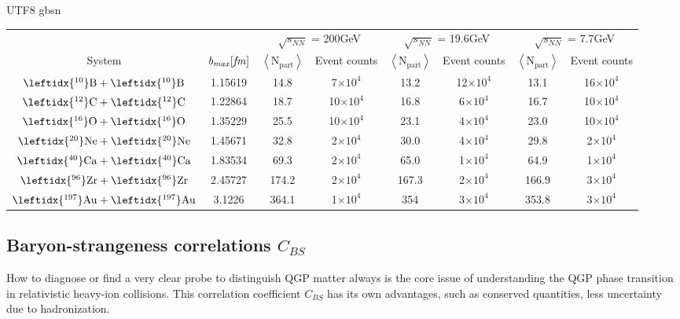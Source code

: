 \documentclass[twocolumn,showpacs,preprintnumbers,superscriptaddress,amsmath,amssymb]{revtex4}
\begin{document}
\begin{CJK*} {UTF8} {gbsn}
\begin{table*}[]
	\begin{tabular}{cc|cc|cc|cc}
\toprule
\multicolumn{2}{c}{} & \multicolumn{2}{c}{$\sqrt{s_{NN}}$ = 200GeV} & \multicolumn{2}{c}{$\sqrt{s_{NN}}$ = 19.6GeV} & \multicolumn{2}{c}{$\sqrt{s_{NN}}$ = 7.7GeV} \\
\cmidrule(r){3-4} \cmidrule(r){5-6} \cmidrule(r){7-8}
System & $\mathrm{\it{b_{max}}[\it{fm}]}$
&$\left\langle \mathrm{N_{part}}\right\rangle$ &Event counts
&$\left\langle \mathrm{N_{part}}\right\rangle$ &Event counts
&$\left\langle \mathrm{N_{part}}\right\rangle$ &Event counts      \\
\hline
$\mathrm{\leftidx{^{10}}B} + \mathrm{\leftidx{^{10}}B}$		&1.15619		&14.8  &7$\times 10^{4}$    	&13.2  &12$\times 10^{4}$  &13.1  &16$\times 10^{4}$\\
$\mathrm{\leftidx{^{12}}C} + \mathrm{\leftidx{^{12}}C}$		&1.22864		&18.7  &10$\times 10^{4}$    	&16.8  &6$\times 10^{4}$ 	&16.7  &10$\times 10^{4}$\\
$\mathrm{\leftidx{^{16}}O}+\mathrm{\leftidx{^{16}}O}$		&1.35229		&25.5   &10$\times 10^{4}$	&23.1  &4$\times 10^{4}$	&23.0  &10$\times 10^{4}$ \\
$\mathrm{\leftidx{^{20}}Ne}+\mathrm{\leftidx{^{20}}Ne}$		&1.45671		&32.8  &2$\times 10^{4}$	&30.0  &4$\times 10^{4}$	&29.8  &2$\times 10^{4}$\\
$\mathrm{\leftidx{^{40}}Ca}+\mathrm{\leftidx{^{40}}Ca}$		&1.83534		&69.3  &2$\times 10^{4}$	&65.0  &1$\times 10^{4}$	&64.9  &1$\times 10^{4}$ \\
$\mathrm{\leftidx{^{96}}Zr}+\mathrm{\leftidx{^{96}}Zr}$ 		&2.45727		&174.2 &2$\times 10^{4}$	&167.3  &2$\times 10^{4}$	&166.9 &3$\times 10^{4}$\\
$\mathrm{\leftidx{^{197}}Au}+\mathrm{\leftidx{^{197}}Au}$		&3.1226		&364.1 &1$\times 10^{4}$	&354  &3$\times 10^{4}$	&353.8  &3$\times 10^{4}$\\
\bottomrule
\end{tabular}
\end{table*}
	
	\subsection{Baryon-strangeness correlations $C_{BS}$}
	How to diagnose or find a very clear probe to distinguish QGP matter always is the core issue of understanding the QGP phase transition in relativistic heavy-ion collisions.
	This correlation coefficient $C_{BS}$ has its own advantages, such as conserved quantities, less uncertainty due to hadronization.
	

\end{CJK*}
\end{document}
